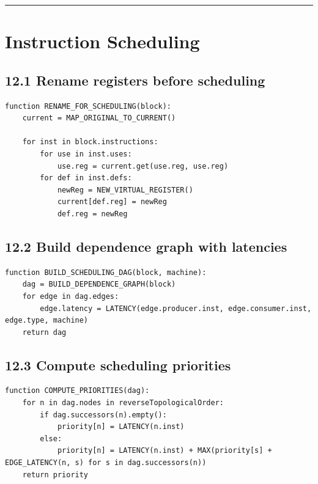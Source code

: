 \documentclass[10pt,letterpaper]{article}
\begin{document}
\medskip\hrule\medskip

\clearpage
\section{Instruction Scheduling}

\subsection*{12.1 Rename registers before scheduling}
{}

\begin{verbatim}
function RENAME_FOR_SCHEDULING(block):
    current = MAP_ORIGINAL_TO_CURRENT()

    for inst in block.instructions:
        for use in inst.uses:
            use.reg = current.get(use.reg, use.reg)
        for def in inst.defs:
            newReg = NEW_VIRTUAL_REGISTER()
            current[def.reg] = newReg
            def.reg = newReg
\end{verbatim}

\subsection*{12.2 Build dependence graph with latencies}
{}

\begin{verbatim}
function BUILD_SCHEDULING_DAG(block, machine):
    dag = BUILD_DEPENDENCE_GRAPH(block)
    for edge in dag.edges:
        edge.latency = LATENCY(edge.producer.inst, edge.consumer.inst, edge.type, machine)
    return dag
\end{verbatim}

\subsection*{12.3 Compute scheduling priorities}
{}

\begin{verbatim}
function COMPUTE_PRIORITIES(dag):
    for n in dag.nodes in reverseTopologicalOrder:
        if dag.successors(n).empty():
            priority[n] = LATENCY(n.inst)
        else:
            priority[n] = LATENCY(n.inst) + MAX(priority[s] + EDGE_LATENCY(n, s) for s in dag.successors(n))
    return priority
\end{verbatim}
\end{document}

